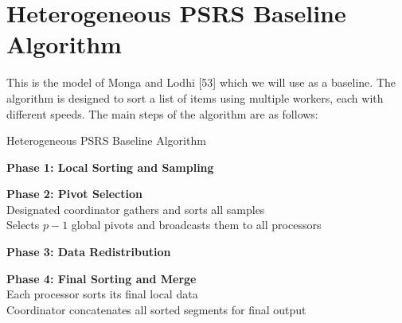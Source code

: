 \documentclass[]{interact}
\theoremstyle{plain}
\theoremstyle{definition}
\theoremstyle{remark}
\begin{document}
\section{Heterogeneous PSRS Baseline Algorithm}

This is the model of Monga and Lodhi [53] which we will use as a baseline. The algorithm is designed to sort a list of items using multiple workers, each with different speeds. The main steps of the algorithm are as follows:

\begin{algorithm}[H]
\caption{Heterogeneous PSRS Baseline Algorithm}

\textbf{Phase 1: Local Sorting and Sampling} \\

\textbf{Phase 2: Pivot Selection} \\
Designated coordinator gathers and sorts all samples \\
Selects $p - 1$ global pivots and broadcasts them to all processors

\textbf{Phase 3: Data Redistribution} \\

\textbf{Phase 4: Final Sorting and Merge} \\
Each processor sorts its final local data \\
Coordinator concatenates all sorted segments for final output
\end{algorithm}
\end{document}
